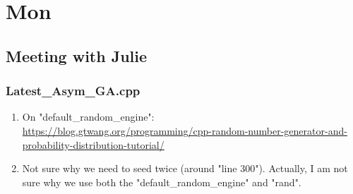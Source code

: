 \documentclass[12pt,letterpaper]{article}
\begin{document}
\section{Mon}
\subsection{Meeting with Julie}
\subsubsection{Latest\_Asym\_GA.cpp}
\begin{enumerate}
  \item On "default_random_engine":\\
    \url{https://blog.gtwang.org/programming/cpp-random-number-generator-and-probability-distribution-tutorial/}
  \item Not sure why we need to seed twice (around "line 300"). Actually, I am not sure
    why we use both the "default_random_engine" and "rand".
\end{enumerate}

\end{document}
